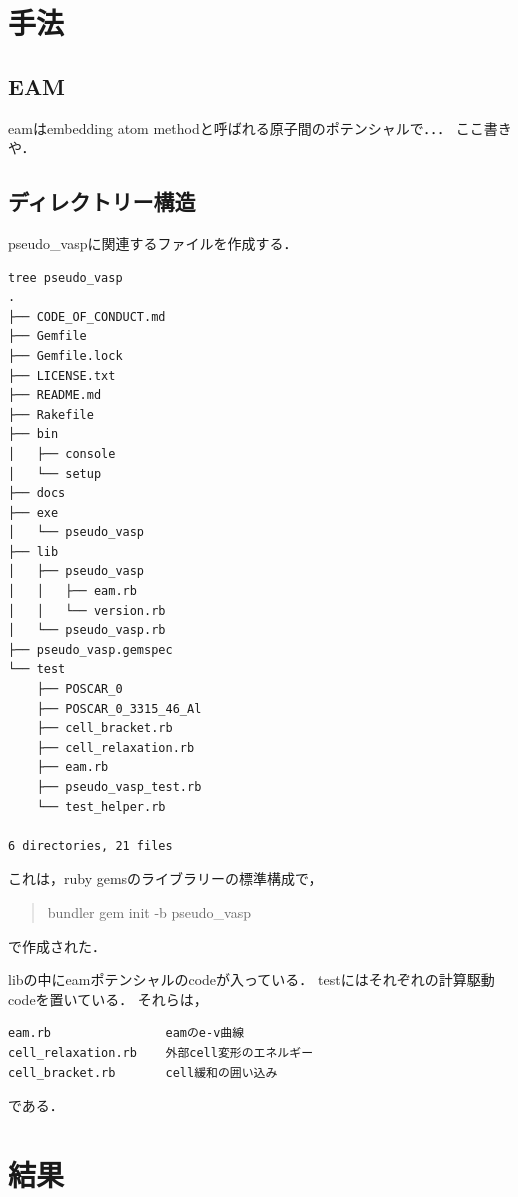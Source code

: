     \section{手法}\label{ux624bux6cd5}

\subsection{EAM}\label{eam}

eamはembedding atom methodと呼ばれる原子間のポテンシャルで．．．
ここ書きや．

    \subsection{ディレクトリー構造}\label{ux30c7ux30a3ux30ecux30afux30c8ux30eaux30fcux69cbux9020}

pseudo\_vaspに関連するファイルを作成する．

\begin{verbatim}
tree pseudo_vasp
.
├── CODE_OF_CONDUCT.md
├── Gemfile
├── Gemfile.lock
├── LICENSE.txt
├── README.md
├── Rakefile
├── bin
│   ├── console
│   └── setup
├── docs
├── exe
│   └── pseudo_vasp
├── lib
│   ├── pseudo_vasp
│   │   ├── eam.rb
│   │   └── version.rb
│   └── pseudo_vasp.rb
├── pseudo_vasp.gemspec
└── test
    ├── POSCAR_0
    ├── POSCAR_0_3315_46_Al
    ├── cell_bracket.rb
    ├── cell_relaxation.rb
    ├── eam.rb
    ├── pseudo_vasp_test.rb
    └── test_helper.rb

6 directories, 21 files
\end{verbatim}

これは，ruby gemsのライブラリーの標準構成で，

\begin{quote}
bundler gem init -b pseudo\_vasp
\end{quote}
で作成された．

libの中にeamポテンシャルのcodeが入っている．
testにはそれぞれの計算駆動codeを置いている． それらは，

\begin{verbatim}
eam.rb                eamのe-v曲線
cell_relaxation.rb    外部cell変形のエネルギー
cell_bracket.rb       cell緩和の囲い込み
\end{verbatim}

である．

    \section{結果}\label{ux7d50ux679c}

